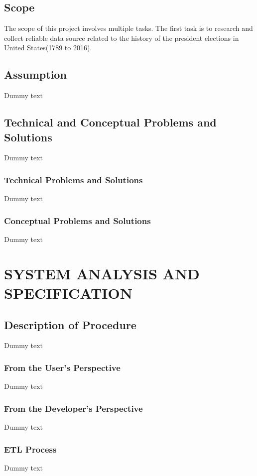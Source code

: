 \documentclass{article}
\begin{document}
\subsection{Scope}
The scope of this project involves multiple tasks. The first task is to research and collect reliable data source related to the history of the president elections in United States(1789 to 2016). 

\subsection{Assumption}
Dummy text

\subsection{Technical and Conceptual Problems and Solutions}
Dummy text
\subsubsection{Technical Problems and Solutions}
Dummy text

\subsubsection{Conceptual Problems and Solutions}
Dummy text



\section{SYSTEM ANALYSIS AND SPECIFICATION}
\subsection{Description of Procedure}
Dummy text

\subsubsection{From the User's Perspective}
Dummy text

\subsubsection{From the Developer's Perspective}
Dummy text

\subsubsection{ETL Process}
Dummy text
\end{document}
